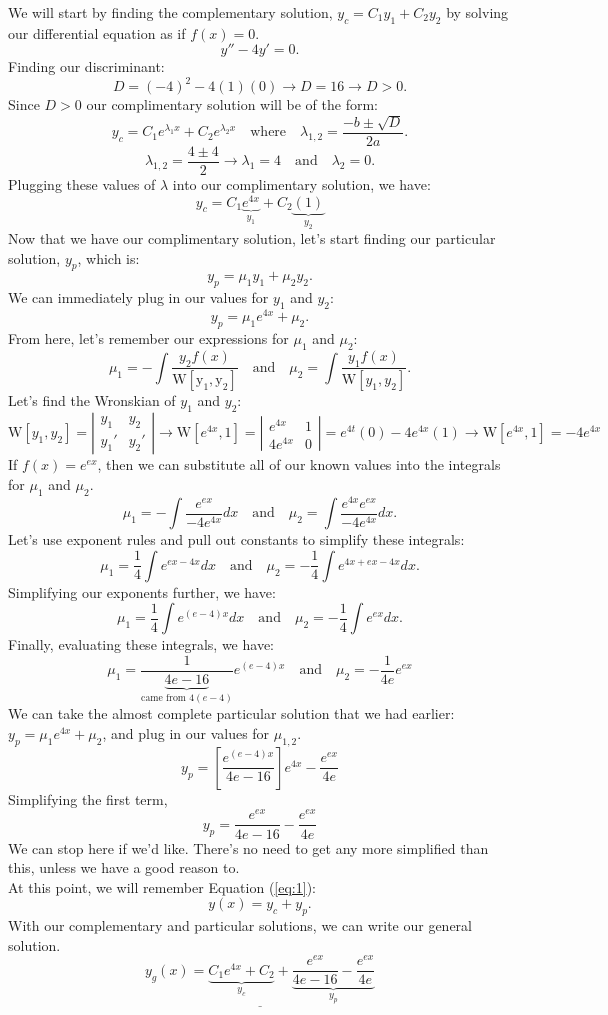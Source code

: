 \documentclass[a4paper,12pt]{article}
\begin{document}
We will start by finding the complementary solution, $y_c=C_1 y_1+C_2 y_2$ by solving our differential equation as if $f(x)=0$.
$$ y''-4y' = 0. $$
Finding our discriminant:
$$ D = (-4)^2 - 4(1)(0) \rightarrow D = 16 \rightarrow D>0. $$
Since $D>0$ our complimentary solution will be of the form:
$$ y_c = C_1e^{\lambda_1x} + C_2e^{\lambda_2x} \quad\text{where}\quad \lambda_{1,2} = \frac{-b \pm \sqrt{D}}{2a}. $$
$$ \lambda_{1,2} = \frac{4 \pm 4}{2} \rightarrow \lambda_1 = 4 \quad\text{and}\quad \lambda_2 = 0. $$
Plugging these values of $\lambda$ into our complimentary solution, we have:
$$ \boxed{y_c = C_1\underbrace{e^{4x}}_{y_1} + C_2\underbrace{(1)}_{y_2}} $$
Now that we have our complimentary solution, let's start finding our particular solution, $y_p$, which is:
$$ y_p = \mu_1y_1 + \mu_2y_2. $$
We can immediately plug in our values for $y_1$ and $y_2$:
$$ y_p = \mu_1e^{4x} + \mu_2. $$
From here, let's remember our expressions for $\mu_1$ and $\mu_2$:
$$ \mu_1 = -\int \frac{y_2f(x)}{\mathrm{W[y_1,y_2]}} \quad \text{and} \quad \mu_2 = \int \frac{y_1f(x)}{\mathrm{W}[y_1,y_2]} .$$
Let's find the Wronskian of $y_1$ and $y_2$:
$$ \mathrm{W}[y_1,y_2] = \left|\begin{matrix}
	y_1 & y_2 \\
	y_1' & y_2'
\end{matrix}\right| \rightarrow \mathrm{W}\left[e^{4x}, 1\right] = \left|\begin{matrix}
	e^{4x} & 1 \\
	4e^{4x} & 0
\end{matrix}\right| = e^{4t}(0) - 4e^{4x}(1) \rightarrow \boxed{\mathrm{W}\left[e^{4x}, 1\right] = -4e^{4x}}$$
If $f(x) = e^{ex}$, then we can substitute all of our known values into the integrals for $\mu_1$ and $\mu_2$.
$$ \mu_1 = -\int \frac{e^{ex}}{-4e^{4x}}dx \quad\text{and}\quad \mu_2 = \int \frac{e^{4x}e^{ex}}{-4e^{4x}}dx.$$
Let's use exponent rules and pull out constants to simplify these integrals:
$$ \mu_1 = \frac{1}{4} \int e^{ex - 4x}dx \quad\text{and}\quad \mu_2 = -\frac{1}{4}\int e^{4x + ex - 4x} dx. $$
Simplifying our exponents further, we have:
$$ \mu_1 = \frac{1}{4}\int e^{(e-4)x}dx \quad\text{and}\quad \mu_2 = -\frac{1}{4}\int e^{ex}dx.  $$
Finally, evaluating these integrals, we have:
$$ \mu_1 = \frac{1}{\underbrace{4e-16}_{\text{came from }4(e-4)}}e^{(e-4)x} \quad\text{and}\quad \mu_2 = -\frac{1}{4e} e^{ex}  $$
We can take the almost complete particular solution that we had earlier: $y_p = \mu_1 e^{4x} + \mu_2$, and plug in our values for $\mu_{1,2}$.
$$ y_p = \left[\frac{e^{(e-4)x}}{4e-16}\right]e^{4x} - \frac{e^{ex}}{4e} $$
Simplifying the first term,
$$ \boxed{y_p = \frac{e^{ex}}{4e-16} - \frac{e^{ex}}{4e}} $$
We can stop here if we'd like. There's no need to get any more simplified than this, unless we have a good reason to.\\

At this point, we will remember Equation (\ref{eq:1}):
$$ y(x) = y_c + y_p. $$
With our complementary and particular solutions, we can write our general solution.
$$ \underline{\boxed{y_g(x) = \underbrace{C_1e^{4x} + C_2}_{y_c} + \underbrace{\frac{e^{ex}}{4e-16} - \frac{e^{ex}}{4e}}_{y_p}}} $$
\end{document}

